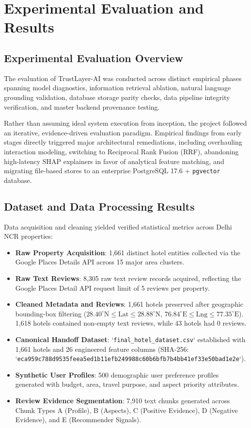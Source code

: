 \chapter{Experimental Evaluation and Results}\label{ch:results}

\section{Experimental Evaluation Overview}
The evaluation of TrustLayer-AI was conducted across distinct empirical phases spanning model diagnostics, information retrieval ablation, natural language grounding validation, database storage parity checks, data pipeline integrity verification, and master backend provenance testing. 

Rather than assuming ideal system execution from inception, the project followed an iterative, evidence-driven evaluation paradigm. Empirical findings from early stages directly triggered major architectural remediations, including overhauling interaction modeling, switching to Reciprocal Rank Fusion (RRF), abandoning high-latency SHAP explainers in favor of analytical feature matching, and migrating file-based stores to an enterprise PostgreSQL 17.6 + \texttt{pgvector} database.

\section{Dataset and Data Processing Results}
Data acquisition and cleaning yielded verified statistical metrics across Delhi NCR properties:
\begin{itemize}
    \item \textbf{Raw Property Acquisition}: 1,661 distinct hotel entities collected via the Google Places Details API across 15 major area clusters.
    \item \textbf{Raw Text Reviews}: 8,305 raw text review records acquired, reflecting the Google Places Detail API request limit of 5 reviews per property.
    \item \textbf{Cleaned Metadata and Reviews}: 1,661 hotels preserved after geographic bounding-box filtering ($28.40^\circ\text{N} \le \text{Lat} \le 28.88^\circ\text{N}$, $76.84^\circ\text{E} \le \text{Lng} \le 77.35^\circ\text{E}$). 1,618 hotels contained non-empty text reviews, while 43 hotels had 0 reviews.
    \item \textbf{Canonical Handoff Dataset}: `\texttt{final\_hotel\_dataset.csv}` established with 1,661 hotels and 26 engineered feature columns (SHA-256: `\texttt{eca959c788d9535feea5ed1b11efb249988c60b6bfb7b4bb41ef33e50bad1e2e}`).
    \item \textbf{Synthetic User Profiles}: 500 demographic user preference profiles generated with budget, area, travel purpose, and aspect priority attributes.
    \item \textbf{Review Evidence Segmentation}: 7,910 text chunks generated across Chunk Types A (Profile), B (Aspects), C (Positive Evidence), D (Negative Evidence), and E (Recommender Signals).
\end{itemize}

